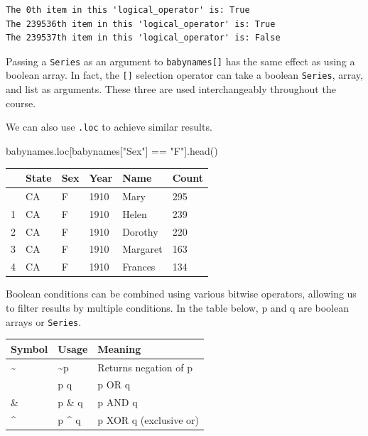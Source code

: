 \documentclass[
  letterpaper,
  DIV=11,
  numbers=noendperiod]{scrreprt}
\newenvironment{Shaded}{\begin{snugshade}}{\end{snugshade}}
\newcommand{\NormalTok}[1]{\textcolor[rgb]{0.00,0.23,0.31}{#1}}
\newcommand{\OperatorTok}[1]{\textcolor[rgb]{0.37,0.37,0.37}{#1}}
\newcommand{\StringTok}[1]{\textcolor[rgb]{0.13,0.47,0.30}{#1}}
\begin{document}
\begin{verbatim}
The 0th item in this 'logical_operator' is: True
The 239536th item in this 'logical_operator' is: True
The 239537th item in this 'logical_operator' is: False
\end{verbatim}

Passing a \texttt{Series} as an argument to \texttt{babynames{[}{]}} has
the same effect as using a boolean array. In fact, the \texttt{{[}{]}}
selection operator can take a boolean \texttt{Series}, array, and list
as arguments. These three are used interchangeably throughout the
course.

We can also use \texttt{.loc} to achieve similar results.

\begin{Shaded}
\begin{Highlighting}[]
\NormalTok{babynames.loc[babynames[}\StringTok{"Sex"}\NormalTok{] }\OperatorTok{==} \StringTok{"F"}\NormalTok{].head()}
\end{Highlighting}
\end{Shaded}

\begin{longtable}[]{@{}llllll@{}}
\toprule\noalign{}
& State & Sex & Year & Name & Count \\
\midrule\noalign{}
\endhead
\bottomrule\noalign{}
\endlastfoot
0 & CA & F & 1910 & Mary & 295 \\
1 & CA & F & 1910 & Helen & 239 \\
2 & CA & F & 1910 & Dorothy & 220 \\
3 & CA & F & 1910 & Margaret & 163 \\
4 & CA & F & 1910 & Frances & 134 \\
\end{longtable}

Boolean conditions can be combined using various bitwise operators,
allowing us to filter results by multiple conditions. In the table
below, p and q are boolean arrays or \texttt{Series}.

\begin{longtable}[]{@{}lll@{}}
\toprule\noalign{}
Symbol & Usage & Meaning \\
\midrule\noalign{}
\endhead
\bottomrule\noalign{}
\endlastfoot
\textasciitilde{} & \textasciitilde p & Returns negation of p \\
\textbar{} & p \textbar{} q & p OR q \\
\& & p \& q & p AND q \\
\^{} & p \^{} q & p XOR q (exclusive or) \\
\end{longtable}
\end{document}

